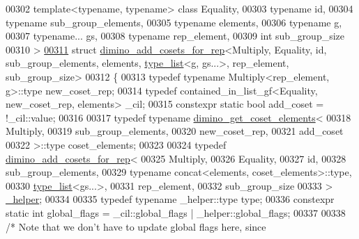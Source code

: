 \begin{DoxyCode}
00302   \textcolor{keyword}{template}<\textcolor{keyword}{typename}, \textcolor{keyword}{typename}> \textcolor{keyword}{class }Equality,
00303   \textcolor{keyword}{typename} id,
00304   \textcolor{keyword}{typename} sub\_group\_elements,
00305   \textcolor{keyword}{typename} elements,
00306   \textcolor{keyword}{typename} g,
00307   \textcolor{keyword}{typename}... gs,
00308   \textcolor{keyword}{typename} rep\_element,
00309   \textcolor{keywordtype}{int} sub\_group\_size
00310 >
\hyperlink{struct_eigen_1_1internal_1_1group__theory_1_1dimino__add__cosets__for__rep_3_01_multiply_00_01_e632095b5337826777d5a1f8cb0eea391}{00311} \textcolor{keyword}{struct }\hyperlink{struct_eigen_1_1internal_1_1group__theory_1_1dimino__add__cosets__for__rep}{dimino\_add\_cosets\_for\_rep}<Multiply, Equality, id, sub\_group\_elements, 
      elements, \hyperlink{struct_eigen_1_1internal_1_1type__list}{type\_list}<g, gs...>, rep\_element, sub\_group\_size>
00312 \{
00313   \textcolor{keyword}{typedef} \textcolor{keyword}{typename} Multiply<rep\_element, g>::type new\_coset\_rep;
00314   \textcolor{keyword}{typedef} contained\_in\_list\_gf<Equality, new\_coset\_rep, elements> \_cil;
00315   constexpr \textcolor{keyword}{static} \textcolor{keywordtype}{bool} add\_coset = !\_cil::value;
00316 
00317   \textcolor{keyword}{typedef} \textcolor{keyword}{typename} \hyperlink{struct_eigen_1_1internal_1_1group__theory_1_1dimino__get__coset__elements}{dimino\_get\_coset\_elements}<
00318     Multiply,
00319     sub\_group\_elements,
00320     new\_coset\_rep,
00321     add\_coset
00322   >::type coset\_elements;
00323 
00324   \textcolor{keyword}{typedef} \hyperlink{struct_eigen_1_1internal_1_1group__theory_1_1dimino__add__cosets__for__rep}{dimino\_add\_cosets\_for\_rep}<
00325     Multiply,
00326     Equality,
00327     id,
00328     sub\_group\_elements,
00329     \textcolor{keyword}{typename} concat<elements, coset\_elements>::type,
00330     \hyperlink{struct_eigen_1_1internal_1_1type__list}{type\_list}<gs...>,
00331     rep\_element,
00332     sub\_group\_size
00333   > \hyperlink{struct_eigen_1_1internal_1_1group__theory_1_1dimino__add__cosets__for__rep}{\_helper};
00334 
00335   \textcolor{keyword}{typedef} \textcolor{keyword}{typename} \_helper::type type;
00336   constexpr \textcolor{keyword}{static} \textcolor{keywordtype}{int} global\_flags = \_cil::global\_flags | \_helper::global\_flags;
00337 
00338   \textcolor{comment}{/* Note that we don't have to update global flags here, since}

\end{DoxyCode}
